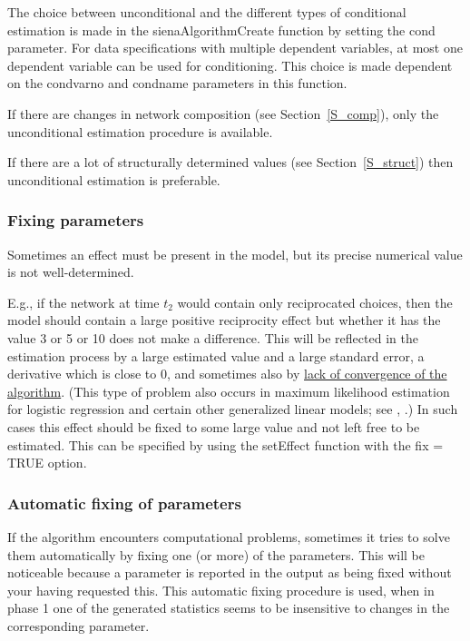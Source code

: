 \documentclass[a4paper,fleqn,11pt]{article}
\newcommand{\+}{\, + \,}
\begin{document}
The choice between
unconditional and the different types of conditional estimation is
made in the \textsf{sienaAlgorithmCreate} function by setting the
\textsf{cond} parameter.
For data specifications with multiple dependent variables,
at most one dependent variable can be used for conditioning.
This choice is made dependent on the
\textsf{condvarno} and \textsf{condname} parameters in this function.

If there are changes in network composition (see
Section~\ref{S_comp}), only the unconditional estimation procedure
is available.

If there are a lot of structurally determined values (see Section~\ref{S_struct})
then unconditional estimation is preferable.


\subsubsection{Fixing parameters}
\label{S_fixingparameters}

\hypertarget{T_fix}{Sometimes an effect must be present in the
model, but its precise numerical value is not well-determined.}
E.g., if the network at time $t_2$ would contain only reciprocated
choices, then the model should contain a large positive
reciprocity effect but whether it has the value 3 or 5 or 10 does
not make a difference. This will be reflected in the estimation
process by a large estimated value and a large standard error, a
derivative which is close to 0, and sometimes also by
\hyperlink{T_convergence}{lack of convergence of the algorithm}.
(This type of problem also occurs in maximum likelihood estimation
for logistic regression and certain other generalized linear
models; \label{LargeFix} see \citet[section 1.6]{GeyerThompson92},
\citet{AlbertAnderson84, HauckDonner77}.)
In such cases this effect
should be fixed to some large value and not left free to be
estimated. This can be specified
by using the \textsf{setEffect} function with the
\textsf{fix = TRUE} option.



\subsubsection{Automatic fixing of parameters}
\label{S_fixing}

If the algorithm encounters computational
problems, sometimes it tries to solve them automatically by fixing
one (or more) of the parameters. This will be noticeable because a
parameter is reported in the output as being fixed without your
having requested this. This automatic fixing procedure is used,
when in phase 1 one of the generated statistics seems to be
insensitive to changes in the corresponding parameter.
\end{document}
